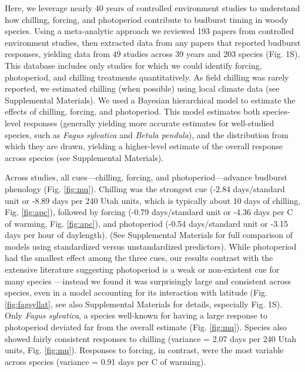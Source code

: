 \documentclass{article}
\begin{document}
\par Here, we leverage nearly 40 years of controlled environment studies to understand how chilling, forcing, and photoperiod contribute to budburst timing in woody species. Using a meta-analytic approach we reviewed 193 papers from controlled environment studies, then extracted data from any papers that reported budburst responses, yielding data from 49 studies across 39 years and 203 species (Fig. 1S). This database includes only studies for which we could identify forcing, photoperiod, and chilling treatments quantitatively. As field chilling was rarely reported, we estimated chilling (when possible) using local climate data (see Supplemental Materials). We used a Bayesian hierarchical model to estimate the effects of chilling, forcing, and photoperiod. This model estimates both species-level responses (generally yielding more accurate estimates for well-studied species, such as \emph{Fagus sylvatica} and \emph{Betula pendula}), and the distribution from which they are drawn, yielding a higher-level estimate of the overall response across species (see Supplemental Materials).

\par Across studies, all cues---chilling, forcing, and photoperiod---advance budburst phenology (Fig. \ref {fig:mu}). Chilling was the strongest cue (-2.84 days/standard unit or -8.89 days per 240 Utah units, which is typically about 10 days of chilling, %
Fig. \ref {fig:apc}), followed by forcing (-0.79 days/standard unit or -4.36 days per \degree C of warming, Fig. \ref {fig:apc}), and photoperiod (-0.54 days/standard unit or -3.15 days per hour of daylength). (See Supplemental Materials for full comparison of models using standardized versus unstandardized predictors). While photoperiod had the smallest effect among the three cues, our results contrast with the extensive literature suggesting photoperiod is a weak or non-existent cue for many species \citep{zohner2016,koerner2010a}---instead we found it was surprisingly large and consistent across species, even in a model accounting for its interaction with latitude (Fig. \ref {fig:fagsyllat}, see also Supplemental Materials for details, especially Fig. 1S). Only \emph{Fagus sylvatica}, a species well-known for having a large response to photoperiod deviated far from the overall estimate (Fig. \ref {fig:mu}). Species also showed fairly consistent responses to chilling (variance = 2.07 days per 240 Utah units, Fig. \ref {fig:mu}).
Responses to forcing, in contrast, were the most variable across species (variance = 0.91 days per \degree C of warming).
\end{document}
